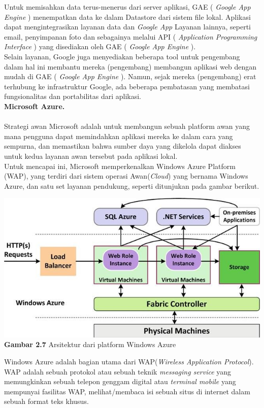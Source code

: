 Untuk memisahkan data terus-menerus dari server aplikasi, GAE ( \textit{Google App Engine} ) menempatkan data ke dalam Datastore dari sistem file lokal. Aplikasi dapat mengintegrasikan layanan data dan \textit{Google App} Layanan lainnya, seperti email, penyimpanan  foto  dan sebagainya melalui API ( \textit{Application Programming Interface} ) yang disediakan oleh GAE ( \textit{Google App Engine} ).\\
Selain layanan, Google juga menyediakan beberapa tool untuk pengembang dalam hal ini membantu mereka (pengembang) membangun aplikasi web dengan mudah di GAE (\textit{ Google App Engine} ). Namun, sejak mereka (pengembang) erat terhubung ke infrastruktur Google, ada beberapa pembatasan yang membatasi fungsionalitas dan portabilitas dari  aplikasi.\\
\textbf{Microsoft Azure.}\\\\
Strategi awan Microsoft adalah untuk membangun sebuah  platform  awan  yang mana pengguna dapat memindahkan aplikasi mereka ke dalam cara yang sempurna, dan memastikan bahwa sumber daya yang dikelola dapat diakses untuk kedua layanan awan tersebut   pada aplikasi lokal.\\
\tab Untuk mencapai ini, Microsoft memperkenalkan Windows Azure Platform (WAP), yang terdiri dari sistem operasi Awan(\textit{Cloud}) yang bernama Windows Azure, dan satu set layanan pendukung, seperti ditunjukan pada gambar  berikut.\\
\begin{center}
\includegraphics[scale=1]{gambar27.jpg} \\
\textbf{Gambar  2.7} Arsitektur  dari platform Windows Azure
\end{center}
Windows Azure adalah bagian utama dari WAP(\textit{Wireless Application Protocol}). WAP adalah sebuah protokol atau sebuah teknik \textit{messaging service} yang memungkinkan sebuah telepon genggam digital atau \textit{terminal mobile} yang mempunyai fasilitas WAP, melihat/membaca isi sebuah situs di internet dalam sebuah format teks khusus.\\
